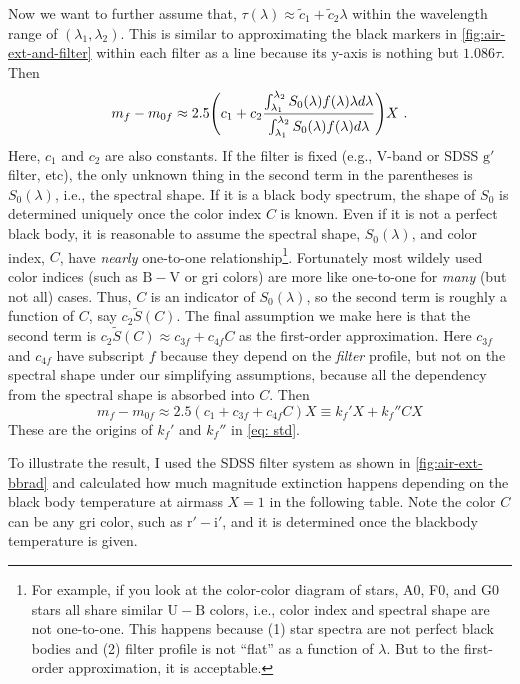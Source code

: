 Now we want to further assume that, $ \tau(\lambda) \approx \tilde{c}_1 + \tilde{c}_2 \lambda $ within the wavelength range of $ (\lambda_1, \lambda_2) $. This is similar to approximating the black markers in \cref{fig:air-ext-and-filter} within each filter as a line because its y-axis is nothing but $ 1.086 \tau $. Then
\begin{equation}
  m_f - m_{0f} 
    \approx 2.5 
    \qty (c_1 + c_2\frac{\int_{\lambda_1}^{\lambda_2} S_0(\lambda) f(\lambda) \lambda d\lambda}
      {\int_{\lambda_1}^{\lambda_2} S_0(\lambda) f(\lambda) d\lambda} ) X ~.
\end{equation}
Here, $ c_1 $ and $ c_2 $ are also constants. If the filter is fixed (e.g., V-band or SDSS $ \mathrm{g'} $ filter, etc), the only unknown thing in the second term in the parentheses is $ S_0(\lambda) $, i.e., the spectral shape. If it is a black body spectrum, the shape of $ S_0 $ is determined uniquely once the color index $ C $ is known. Even if it is not a perfect black body, it is reasonable to assume the spectral shape, $ S_0(\lambda) $, and color index, $ C $, have \textit{nearly} one-to-one relationship\footnote{For example, if you look at the color-color diagram of stars, A0, F0, and G0 stars all share similar $ \mathrm{U} - \mathrm{B} $ colors, i.e., color index and spectral shape are not one-to-one. This happens because (1) star spectra are not perfect black bodies and (2) filter profile is not ``flat'' as a function of $ \lambda $. But to the first-order approximation, it is acceptable.}. Fortunately most wildely used color indices (such as $ \mathrm{B}-\mathrm{V} $ or gri colors) are more like one-to-one for \emph{many} (but not all) cases. Thus, $ C $ is an indicator of $ S_0(\lambda) $, so the second term is roughly a function of $ C $, say $ c_2 \tilde{S}(C) $. The final assumption we make here is that the second term is $ c_2 \tilde{S} (C) \approx c_{3f} + c_{4f} C $ as the first-order approximation. Here $ c_{3f} $ and $ c_{4f} $ have subscript $ f $ because they depend on the \textit{filter} profile, but not on the spectral shape under our simplifying assumptions, because all the dependency from the spectral shape is absorbed into $ C $. Then
\begin{equation}
  m_f - m_{0f} 
  \approx 2.5 (c_1 + c_{3f} + c_{4f} C) X 
  \equiv k_f' X + k_f'' CX
\end{equation}
 These are the origins of $ k_f' $ and $ k_f'' $ in \cref{eq: std}.

To illustrate the result, I used the SDSS filter system as shown in \cref{fig:air-ext-bbrad} and calculated how much magnitude extinction happens depending on the black body temperature
at airmass $ X = 1 $ in the following table. Note the color $ C $ can be any gri color, such as $ \mathrm{r}'-\mathrm{i}' $, and it is determined once the blackbody temperature is given.

